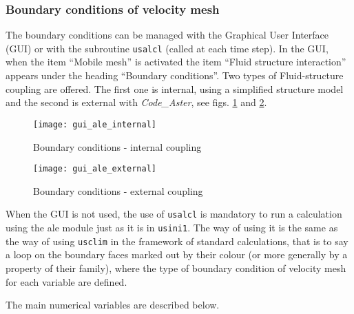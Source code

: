 {{{\subsubsection{Boundary conditions of velocity mesh}
The boundary conditions can be managed with the Graphical User Interface (GUI)
 or with the subroutine \texttt{usalcl} (called at each time step). In the GUI,
 when the item ``Mobile mesh'' is activated  the item ``Fluid structure interaction''
 appears under the heading ``Boundary conditions''. Two types of Fluid-structure
 coupling are offered. The first one is internal, using a simplified structure
 model and the second is external with \textit{Code\_Aster}, see figs.
 \ref{fig:CL-ale1} and  \ref{fig:CL-ale2}.
%
\begin{figure}[ht]
\begin{center}
\texttt{[image: gui\_ale\_internal]}
\caption{Boundary conditions - internal coupling}
\label{fig:CL-ale1}
\end{center}
\end{figure}
%
\begin{figure}[ht]
\begin{center}
\texttt{[image: gui\_ale\_external]}
\caption{Boundary conditions - external coupling}
\label{fig:CL-ale2}
\end{center}
\end{figure}

When the GUI is not used, the use of \texttt{usalcl} is mandatory to run
 a calculation using
the ale module just as it is in \texttt{usini1}. The way of using it
is the same as the way of using \texttt{usclim} in the framework of
standard calculations, that is to say a loop on the boundary faces
marked out by their colour (or more generally by a property of their
family), where the type of boundary condition of velocity mesh for
each variable are defined.

The main numerical variables are described below.

}}}
